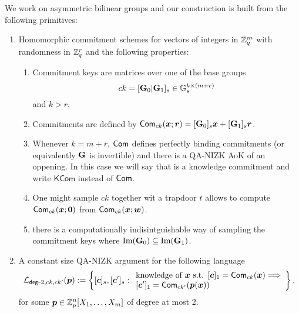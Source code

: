 We work on asymmetric bilinear groups and our construction is built from the following primitives:
\begin{enumerate}
\item Homomorphic commitment schemes for vectors of integers in $\mathbb{Z}_q^m$ with randomness in $\mathbb{Z}_q^r$ and the following properties:
\begin{enumerate}
	\item Commitment keys are matrices over one of the base groups $$ck=[\mathbf{{G}}_0|\mathbf{{G}}_1]_s\in\mathbb{G}_s^{k\times(m+r)}$$ and $k>r$.
	\item Commitments are defined by $\mathsf{Com}_{ck}({\boldsymbol{x}};{\boldsymbol{r}})=[\mathbf{{G}}_0]_s{\boldsymbol{x}}+[\mathbf{{G}}_1]_s{\boldsymbol{r}}$.		\item Whenever $k=m+r$, $\mathsf{Com}$ defines perfectly binding commitments (or equivalently $\mathbf{{G}}$ is invertible) and 	                   there is a QA-NIZK AoK of an oppening. In this case we will say that is a knowledge commitment and write $\mathsf{KCom}$ instead of $\mathsf{Com}$.
	\item One might sample $ck$ together wit a trapdoor $t$ allows to compute $\mathsf{Com}_{ck}({\boldsymbol{x}};{\boldsymbol{0}})$ from $\mathsf{Com}_{ck}({\boldsymbol{x}};{\boldsymbol{w}})$.
	\item there is a computationally indisintguishable way of sampling the commitment keys where $\mathrm{Im}(\mathbf{{G}}_0)\subseteq\mathrm{Im}\mathrm(\mathbf{{G}}_1)$.
\end{enumerate}
\item A constant size QA-NIZK argument for the following language
$$
\mathcal{L}_{\mathsf{deg}\mbox{-}2,ck,ck'}({\boldsymbol{p}}):=\left\{[{\boldsymbol{c}}]_s,[{\boldsymbol{c}}']_s:
\begin{array}{l}
		\text{knowledge of } {\boldsymbol{x}} \text{ s.t. }
		{[{\boldsymbol{c}}]_1=\mathsf{Com}_{ck}({\boldsymbol{x}})}
		\Longrightarrow\\
		{[{\boldsymbol{c}}']_1=\mathsf{Com}_{ck'}({\boldsymbol{p}}({\boldsymbol{x}}))}
	\end{array}\right\},
$$
for some ${\boldsymbol{p}}\in\mathbb{Z}_p^n[X_1,\ldots,X_m]$ of degree at most 2.


\end{enumerate}
